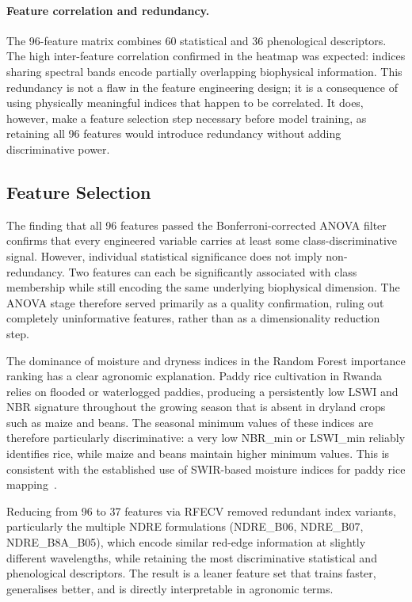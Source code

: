 \paragraph{Feature correlation and redundancy.}
The 96-feature matrix combines 60 statistical and 36 phenological
descriptors. The high inter-feature correlation confirmed in the
heatmap was expected: indices sharing spectral bands encode partially
overlapping biophysical information. This redundancy is not a flaw
in the feature engineering design; it is a consequence of using
physically meaningful indices that happen to be correlated. It does,
however, make a feature selection step necessary before model
training, as retaining all 96 features would introduce redundancy
without adding discriminative power.


\subsection{Feature Selection}
\label{subsec:disc_feature_selection}

The finding that all 96 features passed the Bonferroni-corrected
ANOVA filter confirms that every engineered variable carries at
least some class-discriminative signal. However, individual
statistical significance does not imply non-redundancy. Two features
can each be significantly associated with class membership while
still encoding the same underlying biophysical dimension. The ANOVA
stage therefore served primarily as a quality confirmation,
ruling out completely uninformative features, rather than as a
dimensionality reduction step.

The dominance of moisture and dryness indices in the Random Forest
importance ranking has a clear agronomic explanation. Paddy rice
cultivation in Rwanda relies on flooded or waterlogged paddies,
producing a persistently low LSWI and NBR signature throughout the
growing season that is absent in dryland crops such as maize and
beans. The seasonal minimum values of these indices are therefore
particularly discriminative: a very low NBR\_min or LSWI\_min
reliably identifies rice, while maize and beans maintain higher
minimum values. This is consistent with the established use of
SWIR-based moisture indices for paddy rice
mapping~\cite{xiao2005}.

Reducing from 96 to 37 features via RFECV removed redundant index
variants, particularly the multiple NDRE formulations
(NDRE\_B06, NDRE\_B07, NDRE\_B8A\_B05), which encode similar
red-edge information at slightly different wavelengths, while
retaining the most discriminative statistical and phenological
descriptors. The result is a leaner feature set that trains faster,
generalises better, and is directly interpretable in agronomic
terms.


